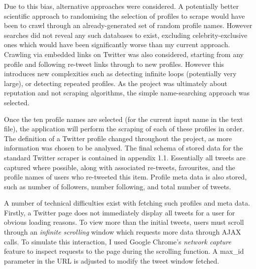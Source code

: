 
Due to this bias, alternative approaches were considered. A potentially better scientific approach to randomising the selection of profiles to scrape would have been to crawl through an already-generated set of random profile names. However searches did not reveal any such databases to exist, excluding celebrity-exclusive ones which would have been significantly worse than my current approach. Crawling via embedded links on Twitter was also considered, starting from any profile and following re-tweet links through to new profiles. However this introduces new complexities such as detecting infinite loops (potentially very large), or detecting repeated profiles. As the project was ultimately about reputation and not scraping algorithms, the simple name-searching approach was selected. 

Once the ten profile names are selected (for the current input name in the text file), the application will perform the scraping of each of these profiles in order.  The definition of a Twitter profile changed throughout the project, as more information was chosen to be analysed. The final schema of stored data for the standard Twitter scraper is contained in appendix 1.1. Essentially all tweets are captured where possible, along with associated re-tweets, favourites, and the profile names of users who re-tweeted this item. Profile meta data is also stored, such as number of followers, number following, and total number of tweets. 

A number of technical difficulties exist with fetching such profiles and meta data. Firstly, a Twitter page does not immediately display all tweets for a user for obvious loading reasons. To view more than the initial tweets, users must scroll through an \textit{infinite scrolling} window which requests more data through AJAX calls. To simulate this interaction, I used Google Chrome's \textit{network capture} feature to inspect requests to the page during the scrolling function. A max\_id parameter in the URL is adjusted to modify the tweet window fetched.

